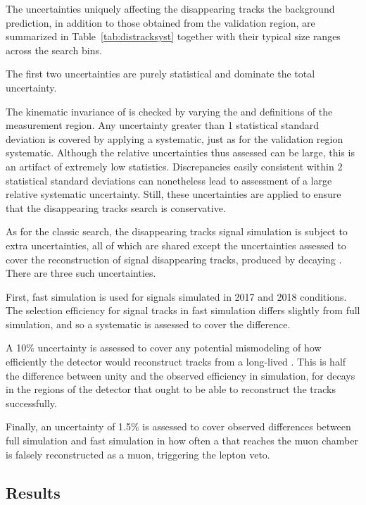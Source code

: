   The uncertainties uniquely affecting the disappearing tracks the background prediction, in addition to those obtained from the validation region, are summarized in Table~\ref{tab:distracksyst} together with their typical size ranges across the search bins.

  The first two uncertainties are purely statistical and dominate the total uncertainty. 

  The kinematic invariance of \fshort is checked by varying the \Ht and \met definitions of the \fshort measurement region.
  Any uncertainty greater than 1 statistical standard deviation is covered by applying a systematic, just as for the validation region systematic.
  Although the relative uncertainties thus assessed can be large, this is an artifact of extremely low statistics.
  Discrepancies easily consistent within 2 statistical standard deviations can nonetheless lead to assessment of a large relative systematic uncertainty.
  Still, these uncertainties are applied to ensure that the disappearing tracks search is conservative.

  As for the classic search, the disappearing tracks signal simulation is subject to extra uncertainties, all of which are shared except the uncertainties assessed to cover the reconstruction of signal disappearing tracks, produced by decaying \chargino.
  There are three such uncertainties.

  First, fast simulation is used for signals simulated in 2017 and 2018 conditions. 
  The selection efficiency for signal tracks in fast simulation differs slightly from full simulation, and so a systematic is assessed to cover the difference.

  A 10\% uncertainty is assessed to cover any potential mismodeling of how efficiently the detector would reconstruct tracks from a long-lived \chargino.
  This is half the difference between unity and the observed efficiency in simulation, for \chargino decays in the regions of the detector that ought to be able to reconstruct the tracks successfully.

  Finally, an uncertainty of 1.5\% is assessed to cover observed differences between full simulation and fast simulation in how often a \chargino that reaches the muon chamber is falsely reconstructed as a muon, triggering the lepton veto.

  \subsection{Results} \label{sec:distracksresults}

